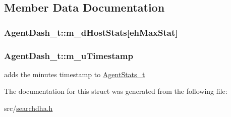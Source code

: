 \subsection{Member Data Documentation}
\hypertarget{structAgentDash__t_ad104f6f60fe02e50c7bd5705f6765079}{
\subsubsection[{m\-\_\-d\-Host\-Stats}]{ Agent\-Dash\-\_\-t\-::m\-\_\-d\-Host\-Stats\mbox{[}{\bf eh\-Max\-Stat}\mbox{]}}}\label{structAgentDash__t_ad104f6f60fe02e50c7bd5705f6765079}
\hypertarget{structAgentDash__t_a280917db5b728a3d4fb9ff3e995f75c8}{
\subsubsection[{m\-\_\-u\-Timestamp}]{ Agent\-Dash\-\_\-t\-::m\-\_\-u\-Timestamp}}\label{structAgentDash__t_a280917db5b728a3d4fb9ff3e995f75c8}


adds the minutes timestamp to \hyperlink{structAgentStats__t}{Agent\-Stats\-\_\-t} 



The documentation for this struct was generated from the following file\-:\begin{DoxyCompactItemize}
\item 
src/\hyperlink{searchdha_8h}{searchdha.\-h}\end{DoxyCompactItemize}
